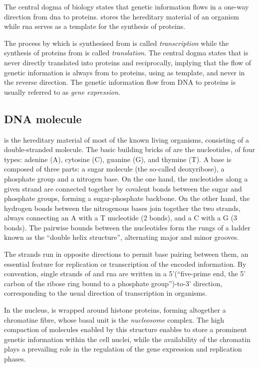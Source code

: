 The central dogma of biology states that genetic information flows in a one-way direction from \gls{dna} to proteins.  stores the hereditary material of an organism while \gls{rna} serves as a template for the synthesis of proteins. 

The process by which  is synthesised from  is called \emph{transcription} while the synthesis of proteins from  is called \emph{translation}. The central dogma states that  is never directly translated into proteins and reciprocally, implying that the flow of genetic information is always from  to proteins, using  as template, and never in the reverse direction. The genetic information flow from DNA to proteins is usually referred to as \emph{gene expression}.


\subsection{DNA molecule}
\label{subsec:DNA}
 is the hereditary material of most of the known living organisms, consisting of a double-stranded molecule. The basic building bricks of  are the nucleotides, of four types: adenine (A), cytosine (C), guanine (G), and thymine (T). A base is composed of three parts: a sugar molecule (the so-called deoxyribose), a phosphate group and a nitrogen base. On the one hand, the nucleotides along a given strand are connected together by covalent bonds between the sugar and phosphate groups, forming a sugar-phosphate \gls{backbone}. On the other hand, the hydrogen bonds between the nitrogenous bases join together the two strands, always connecting an A with a T nucleotide (2 bonds), and a C with a G (3 bonds). The pairwise bounds between the nucleotides form the rungs of a ladder known as the \enquote{double helix structure}, alternating major and minor grooves. 


The strands run in opposite directions to permit base pairing between them, an essential feature for replication or transcription of the encoded information.  By convention, single strands of  and \gls{rna} are written in a 5'(\enquote{five-prime end, the 5' carbon of the ribose ring bound to a phosphate group})-to-3' direction, corresponding to the usual direction of transcription in organisms.

In the nucleus, is wrapped around histone proteins, forming altogether a chromatine fibre, whose basal unit is the \emph{nucleosome} complex. The high compaction of  molecules enabled by this structure enables to store a prominent genetic information within the cell nuclei, while the availability of the chromatin plays a prevailing role in the regulation of the gene expression and replication phases.


